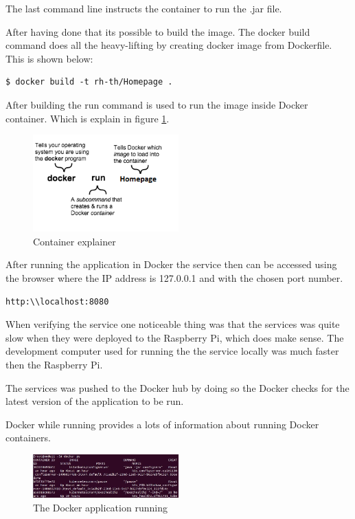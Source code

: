 The last command line instructs the container to run the .jar file. 

After having done that its possible to build the image. The docker build command does all the heavy-lifting by creating docker image from Dockerfile. This is shown below:

\begin{lstlisting}[frame=single]
	$ docker build -t rh-th/Homepage .
\end{lstlisting}

After building the run command is used to run the image inside Docker container. Which is explain in figure \ref{fig:DockerRun}.


\begin{figure}[bht]
  \centering
      \includegraphics[width=0.5\textwidth]{gfx/container_explainer}
  \caption{Container explainer}
  \label{fig:DockerRun}
\end{figure}


After running the application in Docker the service then can be accessed using the browser where the IP address is 127.0.0.1 and with the chosen port number.

\begin{lstlisting}
http:\\localhost:8080
\end{lstlisting} 

When verifying the service one noticeable thing was that the services was quite slow when they were deployed to the Raspberry Pi, which does make sense. The development computer used for running the the service locally was much faster then the Raspberry Pi. 

The services was pushed to the Docker hub by doing so the Docker checks for the latest version of the application to be run. 

Docker while running provides a lots of information about running Docker containers. 


\begin{figure}[bth]
  \centering
      \includegraphics[width=0.5\textwidth]{gfx/DockerPs}
  \caption{The Docker application running}
   \label{fig:DockerPs}
\end{figure}










 